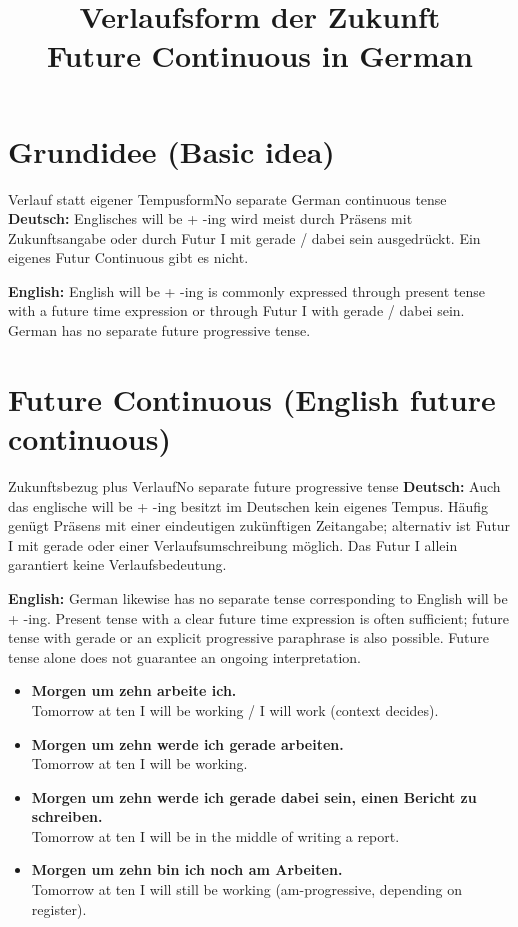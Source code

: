 \documentclass[a4paper,11pt]{article}
\title{Verlaufsform der Zukunft\\\large\textnormal{Future Continuous in German}}
\date{}
\newcommand{\GermanText}[1]{\textbf{Deutsch: }#1\par}
\newcommand{\EnglishText}[1]{{\small\color{SoftGray}\textbf{English: }#1\par}}
\newcommand{\ExampleItem}[2]{\item \textbf{#1}\\{\small\color{SoftGray}#2}}
\begin{document}
    \maketitle
    \tableofcontents
    \newpage


\section{Grundidee \textnormal{(Basic idea)}}
\begin{grammarentry}{Verlauf statt eigener Tempusform}{No separate German continuous tense}
\GermanText{Englisches will be + -ing wird meist durch Präsens mit Zukunftsangabe oder durch Futur I mit gerade / dabei sein ausgedrückt. Ein eigenes Futur Continuous gibt es nicht.}
\EnglishText{English will be + -ing is commonly expressed through present tense with a future time expression or through Futur I with gerade / dabei sein. German has no separate future progressive tense.}
\end{grammarentry}

\section{Future Continuous \textnormal{(English future continuous)}}
\begin{grammarentry}{Zukunftsbezug plus Verlauf}{No separate future progressive tense}
\GermanText{Auch das englische will be + -ing besitzt im Deutschen kein eigenes Tempus. Häufig genügt Präsens mit einer eindeutigen zukünftigen Zeitangabe; alternativ ist Futur I mit gerade oder einer Verlaufsumschreibung möglich. Das Futur I allein garantiert keine Verlaufsbedeutung.}
\EnglishText{German likewise has no separate tense corresponding to English will be + -ing. Present tense with a clear future time expression is often sufficient; future tense with gerade or an explicit progressive paraphrase is also possible. Future tense alone does not guarantee an ongoing interpretation.}
\end{grammarentry}
\begin{exbox}
\begin{itemize}
\ExampleItem{Morgen um zehn arbeite ich.}{Tomorrow at ten I will be working / I will work (context decides).}
\ExampleItem{Morgen um zehn werde ich gerade arbeiten.}{Tomorrow at ten I will be working.}
\ExampleItem{Morgen um zehn werde ich gerade dabei sein, einen Bericht zu schreiben.}{Tomorrow at ten I will be in the middle of writing a report.}
\ExampleItem{Morgen um zehn bin ich noch am Arbeiten.}{Tomorrow at ten I will still be working (am-progressive, depending on register).}
\end{itemize}
\end{exbox}
\end{document}
